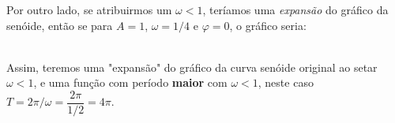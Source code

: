 \documentclass{article}
\begin{document}
Por outro lado, se atribuirmos um $\omega < 1$, teríamos uma \textit{expansão}
do gráfico da senóide, então se para $A = 1$, $\omega = 1/4$ e $\varphi = 0$,
o gráfico seria:\\
\\
Assim, teremos uma "expansão" do gráfico da curva senóide original ao setar $\omega < 1$,
e uma função com período \textbf{maior} com $\omega < 1$, neste caso 
\mbox{$T = 2\pi/\omega = \dfrac{2\pi}{1/2} = 4\pi$}.
\end{document}
